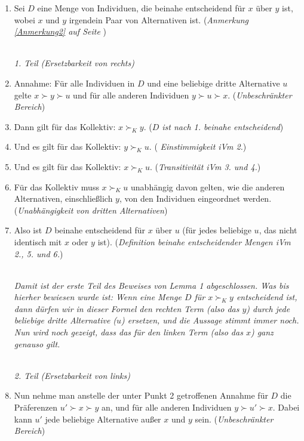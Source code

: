 \begin{enumerate}
  \item Sei $D$ eine Menge von Individuen, die beinahe
    entscheidend für $x$ über $y$ ist, wobei $x$ und $y$ irgendein Paar von
    Alternativen ist. ({\em Anmerkung \ref{Anmerkung2} auf Seite
    \pageref{Anmerkung2}})
 
  ~\\{\em 1. Teil (Ersetzbarkeit von rechts) }\label{Lemma1ErsetzbarkeitVonRechts} 
 
  \item Annahme: Für alle Individuen in $D$ und eine beliebige dritte
  Alternative $u$ gelte $x \succ y \succ u$ und für alle anderen Individuen $y
  \succ u \succ x$. ({\em Unbeschränkter Bereich})
  
  \item Dann gilt für das Kollektiv: $x \succ_K y$. ({\em $D$ ist nach
  1. beinahe entscheidend})
  
  \item Und es gilt für das Kollektiv: $y \succ_K u$. ({\em
  Einstimmigkeit iVm 2.})
  
  \item Und es gilt für das Kollektiv: $x \succ_K u$. ({\em Transitivität iVm 3.
  und 4.})

  \item Für das Kollektiv muss $x \succ_K u$ unabhängig davon gelten, wie die
  anderen Alternativen, einschließlich $y$, von den Individuen eingeordnet
  werden. ({\em Unabhängigkeit von dritten Alternativen})

  \item Also ist $D$ beinahe entscheidend für $x$ über $u$ (für jedes beliebige
  $u$, das nicht identisch mit $x$ oder $y$ ist). ({\em Definition beinahe
  entscheidender Mengen iVm 2., 5. und 6.})

    ~\\{\em Damit ist der erste Teil des Beweises von Lemma 1 abgeschlossen. Was
    bis hierher bewiesen wurde ist: Wenn eine Menge $D$ für $x \succ_K y$
    entscheidend ist, dann dürfen wir in dieser Formel den {\em rechten} Term
    (also das $y$) durch jede beliebige dritte Alternative ($u$) ersetzen, und
    die Aussage stimmt immer noch. Nun wird noch gezeigt, dass das für den
    linken Term (also das $x$) ganz genauso gilt.}
   
    ~\\{\em 2. Teil (Ersetzbarkeit von links)}

  \item Nun nehme man anstelle der unter Punkt 2 getroffenen Annahme für $D$ die
  Präferenzen $u' \succ x \succ y$ an, und für alle anderen Individuen $y \succ
  u' \succ x$. Dabei kann $u'$ jede beliebige Alternative außer $x$ und $y$
  sein. ({\em Unbeschränkter Bereich})
  

\end{enumerate}
